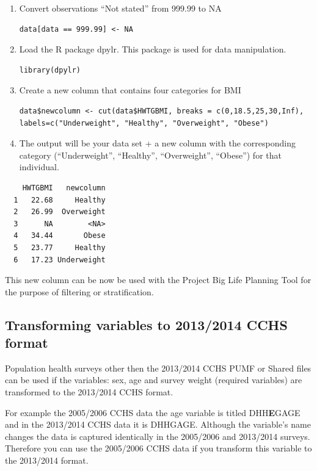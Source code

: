 \documentclass[]{book}
\begin{document}
\begin{enumerate}
\def\labelenumi{\arabic{enumi}.}
\item
  Convert observations ``Not stated'' from 999.99 to NA

\begin{verbatim}
data[data == 999.99] <- NA
\end{verbatim}
\item
  Load the R package dpylr. This package is used for data manipulation.

\begin{verbatim}
library(dpylr)
\end{verbatim}
\item
  Create a new column that contains four categories for BMI

\begin{verbatim}
data$newcolumn <- cut(data$HWTGBMI, breaks = c(0,18.5,25,30,Inf),  labels=c("Underweight", "Healthy", "Overweight", "Obese")
\end{verbatim}
\item
  The output will be your data set + a new column with the corresponding
  category (``Underweight'', ``Healthy'', ``Overweight'', ``Obese'') for
  that individual.
\end{enumerate}

\begin{verbatim}
    HWTGBMI   newcolumn
  1   22.68     Healthy
  2   26.99  Overweight
  3      NA        <NA>
  4   34.44       Obese
  5   23.77     Healthy
  6   17.23 Underweight
\end{verbatim}

This new column can be now be used with the Project Big Life Planning
Tool for the purpose of filtering or stratification.

\subsection{Transforming variables to 2013/2014 CCHS
format}\label{transforming-variables-to-20132014-cchs-format}

Population health surveys other then the 2013/2014 CCHS PUMF or Shared
files can be used if the variables: sex, age and survey weight (required
variables) are transformed to the 2013/2014 CCHS format.

For example the 2005/2006 CCHS data the age variable is titled
DHH\textbf{E}GAGE and in the 2013/2014 CCHS data it is DHHGAGE. Although
the variable's name changes the data is captured identically in the
2005/2006 and 2013/2014 surveys. Therefore you can use the 2005/2006
CCHS data if you transform this variable to the 2013/2014 format.
\end{document}
